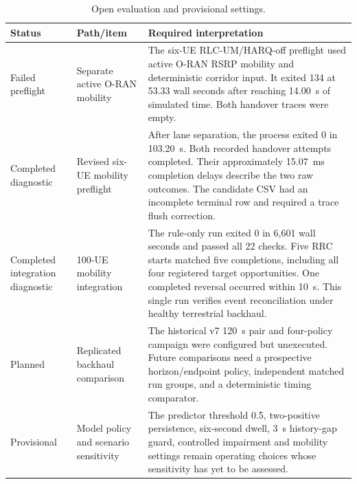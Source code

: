\begin{table}[t]
\centering
\footnotesize
\caption{Open evaluation and provisional settings.}
\label{tab:audited_next_experiments}
\begin{tabular}{p{} p{} p{}}
\hline
Status & Path/item & Required interpretation \\
\hline
Failed preflight & Separate active O-RAN mobility & The six-UE RLC-UM/HARQ-off preflight used active O-RAN RSRP mobility and deterministic corridor input. It exited 134 at 53.33 wall seconds after reaching 14.00~s of simulated time. Both handover traces were empty. \\
Completed diagnostic & Revised six-UE mobility preflight & After lane separation, the process exited 0 in 103.20~s. Both recorded handover attempts completed. Their approximately 15.07~ms completion delays describe the two raw outcomes. The candidate CSV had an incomplete terminal row and required a trace flush correction. \\
Completed integration diagnostic & 100-UE mobility integration & The rule-only run exited 0 in 6,601 wall seconds and passed all 22 checks. Five RRC starts matched five completions, including all four registered target opportunities. One completed reversal occurred within 10~s. This single run verifies event reconciliation under healthy terrestrial backhaul. \\
Planned & Replicated backhaul comparison & The historical v7 120~s pair and four-policy campaign were configured but unexecuted. Future comparisons need a prospective horizon/endpoint policy, independent matched run groups, and a deterministic timing comparator. \\
Provisional & Model policy and scenario sensitivity & The predictor threshold 0.5, two-positive persistence, six-second dwell, 3~s history-gap guard, controlled impairment and mobility settings remain operating choices whose sensitivity has yet to be assessed. \\
\hline
\end{tabular}
\end{table}
\endgroup
